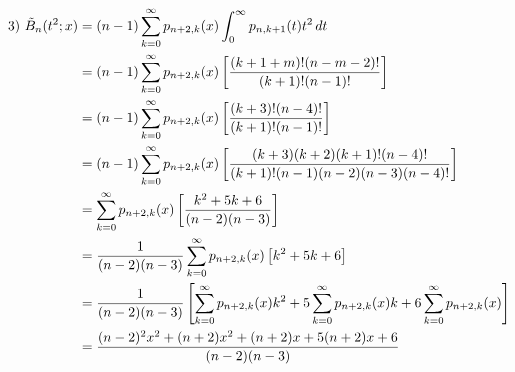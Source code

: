 \begin{align*}
	3) \,\,\tilde{B}_n(t^2; x) &= (n-1)\sum_{k=0}^{\infty} p_{n+2, k}(x) \int_{0}^{\infty} p_{n, k+1}(t)  t^2\, dt\\
	&= (n-1)\sum_{k=0}^{\infty} p_{n+2, k}(x)  \left[\frac{(k+1+m)!(n-m-2)!}{(k+1)!(n-1)!}\right]\\
	&= (n-1)\sum_{k=0}^{\infty} p_{n+2, k}(x) \left[\frac{(k+3)!(n-4)!}{(k+1)!(n-1)!}\right]\\
	&= (n-1)\sum_{k=0}^{\infty} p_{n+2, k}(x)  \left[\frac{(k+3)(k+2)(k+1)!(n-4)!}{(k+1)!(n-1)(n-2)(n-3)(n-4)!}\right]\\
	&= \sum_{k=0}^{\infty} p_{n+2, k}(x) \left[\frac{k^2+5k+6}{(n-2)(n-3)}\right]\\
	&= \frac{1}{(n-2)(n-3)} \sum_{k=0}^{\infty} p_{n+2, k}(x) \left[k^2+5k+6\right]\\
	&= \frac{1}{(n-2)(n-3)} \left[\sum_{k=0}^{\infty} p_{n+2, k}(x) k^2+5\sum_{k=0}^{\infty} p_{n+2, k}(x)  k + 6\sum_{k=0}^{\infty} p_{n+2, k}(x) \right]\\
	&= \frac{(n-2)^2x^2 + (n+2)x^2 + (n+2)x + 5(n+2)x+6}{(n-2)(n-3)}
\end{align*}